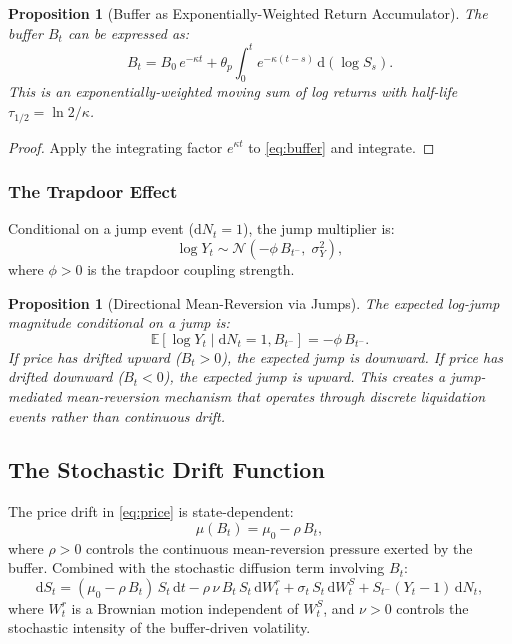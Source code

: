 \documentclass[11pt,a4paper]{article}
\newtheorem{proposition}[theorem]{Proposition}
\newcommand{\E}{\mathbb{E}}
\newcommand{\diff}{\mathrm{d}}
\newcommand{\dt}{\diff t}
\begin{document}
\begin{proposition}[Buffer as Exponentially-Weighted Return Accumulator]
\label{prop:buffer_solution}
The buffer $B_t$ can be expressed as:
\begin{equation}
  B_t = B_0\, e^{-\kappa t} + \theta_p \int_0^t e^{-\kappa(t-s)}\,\diff(\log S_s).
  \label{eq:buffer_solution}
\end{equation}
This is an exponentially-weighted moving sum of log returns with half-life
$\tau_{1/2} = \ln 2 / \kappa$.
\end{proposition}

\begin{proof}
Apply the integrating factor $e^{\kappa t}$ to \eqref{eq:buffer} and integrate.
\end{proof}

\subsubsection{The Trapdoor Effect}

Conditional on a jump event ($\diff N_t = 1$), the jump multiplier is:
\begin{equation}
  \log Y_t \sim \mathcal{N}\!\left(-\phi\, B_{t^-},\; \sigma_Y^2\right),
  \label{eq:trapdoor}
\end{equation}
where $\phi > 0$ is the trapdoor coupling strength.

\begin{proposition}[Directional Mean-Reversion via Jumps]
\label{prop:trapdoor}
The expected log-jump magnitude conditional on a jump is:
\[
  \E[\log Y_t \mid \diff N_t = 1, B_{t^-}] = -\phi\, B_{t^-}.
\]
If price has drifted upward ($B_t > 0$), the expected jump is downward.
If price has drifted downward ($B_t < 0$), the expected jump is upward.
This creates a jump-mediated mean-reversion mechanism that operates through
discrete liquidation events rather than continuous drift.
\end{proposition}

\subsection{The Stochastic Drift Function}
\label{sec:drift}

The price drift in \eqref{eq:price} is state-dependent:
\begin{equation}
  \mu(B_t) = \mu_0 - \rho\, B_t,
  \label{eq:drift}
\end{equation}
where $\rho > 0$ controls the continuous mean-reversion pressure exerted
by the buffer. Combined with the stochastic diffusion term involving $B_t$:
\begin{equation}
  \diff S_t = (\mu_0 - \rho\, B_t)\, S_t\,\dt
  - \rho\,\nu\, B_t\, S_t\,\diff W_t^r
  + \sigma_t\, S_t\,\diff W_t^S
  + S_{t^-}(Y_t - 1)\,\diff N_t,
  \label{eq:price_full}
\end{equation}
where $W_t^r$ is a Brownian motion independent of $W_t^S$, and $\nu > 0$
controls the stochastic intensity of the buffer-driven volatility.
\end{document}
